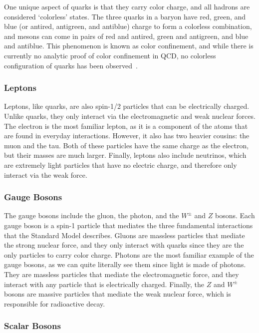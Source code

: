One unique aspect of quarks is that they carry color charge, and all hadrons are considered `colorless' states.
The three quarks in a baryon have red, green, and blue (or antired, antigreen, and antiblue) charge to form a colorless combination, and mesons can come in pairs of red and antired, green and antigreen, and blue and antiblue.
This phenomenon is known as color confinement, and while there is currently no analytic proof of color confinement in QCD, no colorless configuration of quarks has been observed~\cite{muta2010foundations}.

\subsubsection{Leptons}

Leptons, like quarks, are also spin-1/2 particles that can be electrically charged.
Unlike quarks, they only interact via the electromagnetic and weak nuclear forces.
The electron is the most familiar lepton, as it is a component of the atoms that are found in everyday interactions.
However, it also has two heavier cousins: the muon and the tau.
Both of these particles have the same charge as the electron, but their masses are much larger.
Finally, leptons also include neutrinos, which are extremely light particles that have no electric charge, and therefore only interact via the weak force.

\subsubsection{Gauge Bosons}

The gauge bosons include the gluon, the photon, and the $W^\pm$ and $Z$ bosons.
Each gauge boson is a spin-1 particle that mediates the three fundamental interactions that the Standard Model describes.
Gluons are massless particles that mediate the strong nuclear force, and they only interact with quarks since they are the only particles to carry color charge.
Photons are the most familiar example of the gauge bosons, as we can quite literally see them since light is made of photons.
They are massless particles that mediate the electromagnetic force, and they interact with any particle that is electrically charged.
Finally, the $Z$ and $W^\pm$ bosons are massive particles that mediate the weak nuclear force, which is responsible for radioactive decay.

\subsubsection{Scalar Bosons}

